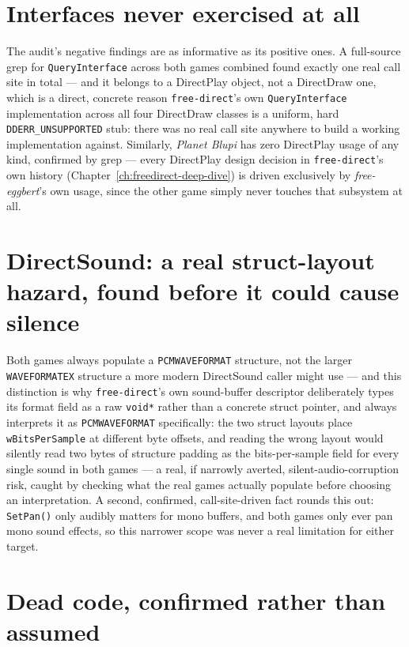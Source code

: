 \section{Interfaces never exercised at all}

The audit's negative findings are as informative as its positive ones. A full-source grep for
\texttt{QueryInterface} across both games combined found exactly one real call site in
total --- and it belongs to a DirectPlay object, not a DirectDraw one, which is a direct,
concrete reason \texttt{free-direct}'s own \texttt{QueryInterface} implementation across all
four DirectDraw classes is a uniform, hard \texttt{DDERR\_UNSUPPORTED} stub: there was no real
call site anywhere to build a working implementation against. Similarly, \emph{Planet Blupi}
has zero DirectPlay usage of any kind, confirmed by grep --- every DirectPlay design decision
in \texttt{free-direct}'s own history (Chapter~\ref{ch:freedirect-deep-dive}) is driven
exclusively by \emph{free-eggbert}'s own usage, since the other game simply never touches
that subsystem at all.

\section{DirectSound: a real struct-layout hazard, found before it could cause silence}

Both games always populate a \texttt{PCMWAVEFORMAT} structure, not the larger
\texttt{WAVEFORMATEX} structure a more modern DirectSound caller might use --- and this
distinction is why \texttt{free-direct}'s own sound-buffer descriptor deliberately types its
format field as a raw \texttt{void*} rather than a concrete struct pointer, and always
interprets it as \texttt{PCMWAVEFORMAT} specifically: the two struct layouts place
\texttt{wBitsPerSample} at different byte offsets, and reading the wrong layout would silently
read two bytes of structure padding as the bits-per-sample field for every single sound in
both games --- a real, if narrowly averted, silent-audio-corruption risk, caught by checking
what the real games actually populate before choosing an interpretation. A second, confirmed,
call-site-driven fact rounds this out: \texttt{SetPan()} only audibly matters for mono
buffers, and both games only ever pan mono sound effects, so this narrower scope was never a
real limitation for either target.

\section{Dead code, confirmed rather than assumed}

